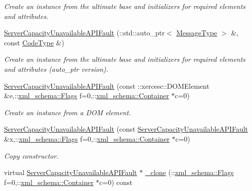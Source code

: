 \begin{DoxyCompactItemize}
\begin{DoxyCompactList}\small\item\em Create an instance from the ultimate base and initializers for required elements and attributes. \item\end{DoxyCompactList}\item 
\hyperlink{classopenstack_1_1xml_1_1ServerCapacityUnavailableAPIFault_ac47c9e6f27d55370ad45ed1871719703}{ServerCapacityUnavailableAPIFault} (::std::auto\_\-ptr$<$ \hyperlink{classopenstack_1_1xml_1_1CloudServersAPIFault_aff7b9d2067747fa033a0ea4408011af6}{MessageType} $>$ \&, const \hyperlink{classopenstack_1_1xml_1_1CloudServersAPIFault_aa9f350c9dba08ae375b2a61568551550}{CodeType} \&)
\begin{DoxyCompactList}\small\item\em Create an instance from the ultimate base and initializers for required elements and attributes (auto\_\-ptr version). \item\end{DoxyCompactList}\item 
\hyperlink{classopenstack_1_1xml_1_1ServerCapacityUnavailableAPIFault_a16ae5afa5030ec6c9e8bf381aa72cdf5}{ServerCapacityUnavailableAPIFault} (const ::xercesc::DOMElement \&e,::\hyperlink{namespacexml__schema_affb4c227cbd9aa7453dd1dc5a1401943}{xml\_\-schema::Flags} f=0,::\hyperlink{namespacexml__schema_a333dea2213742aea47a37532dec4ec27}{xml\_\-schema::Container} $\ast$c=0)
\begin{DoxyCompactList}\small\item\em Create an instance from a DOM element. \item\end{DoxyCompactList}\item 
\hyperlink{classopenstack_1_1xml_1_1ServerCapacityUnavailableAPIFault_adb1b95545963bad8b44d7c7120682dc4}{ServerCapacityUnavailableAPIFault} (const \hyperlink{classopenstack_1_1xml_1_1ServerCapacityUnavailableAPIFault}{ServerCapacityUnavailableAPIFault} \&x,::\hyperlink{namespacexml__schema_affb4c227cbd9aa7453dd1dc5a1401943}{xml\_\-schema::Flags} f=0,::\hyperlink{namespacexml__schema_a333dea2213742aea47a37532dec4ec27}{xml\_\-schema::Container} $\ast$c=0)
\begin{DoxyCompactList}\small\item\em Copy constructor. \item\end{DoxyCompactList}\item 
virtual \hyperlink{classopenstack_1_1xml_1_1ServerCapacityUnavailableAPIFault}{ServerCapacityUnavailableAPIFault} $\ast$ \hyperlink{classopenstack_1_1xml_1_1ServerCapacityUnavailableAPIFault_a2e37a55380068508635f9ff832e38302}{\_\-clone} (::\hyperlink{namespacexml__schema_affb4c227cbd9aa7453dd1dc5a1401943}{xml\_\-schema::Flags} f=0,::\hyperlink{namespacexml__schema_a333dea2213742aea47a37532dec4ec27}{xml\_\-schema::Container} $\ast$c=0) const 

\end{DoxyCompactItemize}
